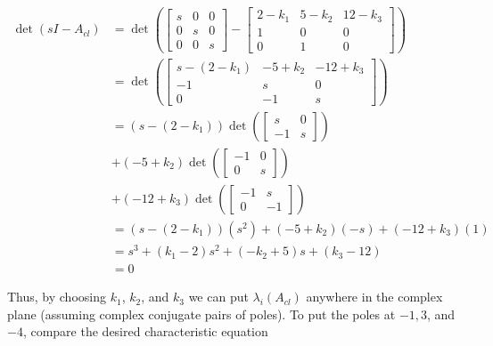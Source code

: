 \documentclass[main.tex]{subfiles}
\begin{document}
\begin{enumerate}
\begin{enumerate}
        $$
        \begin{aligned}
        \operatorname{det}\left(s I-A_{c l}\right) &= \operatorname{det}\left(\left[\begin{array}{ccc}
        s & 0 & 0 \\
        0 & s & 0 \\
        0 & 0 & s
        \end{array}\right] - \left[\begin{array}{ccc}
        2-k_1 & 5-k_2 & 12-k_3 \\
        1 & 0 & 0 \\
        0 & 1 & 0
        \end{array}\right] \right)\\
        &=\operatorname{det}\left(\left[\begin{array}{ccc}
        s-\left(2-k_1\right) & -5+k_2 & -12+k_3 \\
        -1 & s & 0 \\
        0 & -1 & s
        \end{array}\right]\right) \\
        &=\left(s-\left(2-k_1\right)\right) \operatorname{det}\left(\left[\begin{array}{cc}
        s & 0 \\
        -1 & s
        \end{array}\right]\right)\\
        &+\left(-5+k_2\right) \operatorname{det}\left(\left[\begin{array}{cc}
        -1 & 0 \\
        0 & s
        \end{array}\right]\right)\\
        &+\left(-12+k_3\right) \operatorname{det}\left(\left[\begin{array}{cc}
        -1 & s \\
        0 & -1
        \end{array}\right]\right) \\
        & = \left(s-\left(2-k_1\right)\right)\left(s^2\right)+\left(-5+k_2\right)(-s)+\left(-12+k_3\right)(1)\\
        & = s^3 + (k_1-2)s^2 + (-k_2 + 5)s + (k_3 - 12)\\
        & = 0
        \end{aligned}
        $$
        
        Thus, by choosing $k_1$, $k_2$, and $k_3$ we can put $\lambda_i\left(A_{c l}\right)$ anywhere in the complex plane (assuming complex conjugate pairs of poles). To put the poles at $-1, 3$, and $-4$, compare the desired characteristic equation
        

\end{enumerate}
\end{enumerate}
\end{document}
